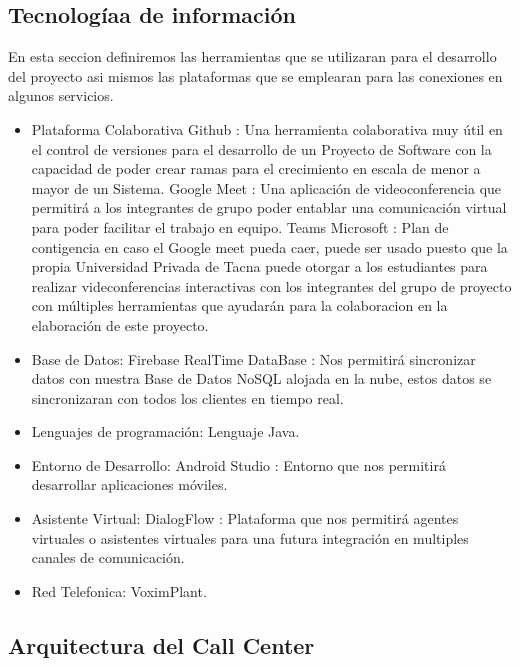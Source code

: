 \documentclass[twoside,twocolumn]{article}
\begin{document}
\subsection{Tecnologíaa de información}
En esta seccion definiremos las herramientas que se utilizaran para el desarrollo del proyecto asi mismos las plataformas que se emplearan para las conexiones en algunos servicios.
\begin{itemize}
\item Plataforma Colaborativa
\subitem Github : Una herramienta colaborativa muy útil en el control de versiones para el desarrollo de un Proyecto de Software con la capacidad de poder crear ramas para el crecimiento en escala de menor a mayor de un Sistema.
\subitem Google Meet : Una aplicación de videoconferencia que permitirá a los integrantes de grupo poder entablar una comunicación virtual para poder facilitar el trabajo en equipo.
\subitem Teams Microsoft : Plan de contigencia en caso el Google meet pueda caer, puede ser usado puesto que la propia Universidad Privada de Tacna puede otorgar a los estudiantes para realizar videconferencias interactivas con los integrantes del grupo de proyecto con múltiples herramientas que ayudarán para la colaboracion en la elaboración de este proyecto.
\item Base de Datos:
\subitem Firebase RealTime DataBase : Nos permitirá sincronizar datos con nuestra Base de Datos NoSQL alojada en la nube, estos datos se sincronizaran con todos los clientes en tiempo real.
\item Lenguajes de programación:
\subitem Lenguaje Java.
\item Entorno de Desarrollo:
\subitem Android Studio : Entorno que nos permitirá desarrollar aplicaciones móviles.
\item Asistente Virtual:
\subitem DialogFlow : Plataforma que nos permitirá agentes virtuales o asistentes virtuales para una futura integración en multiples canales de comunicación.
\item Red Telefonica:
\subitem VoximPlant.
\end{itemize}

\subsection{Arquitectura del Call Center}
\end{document}
